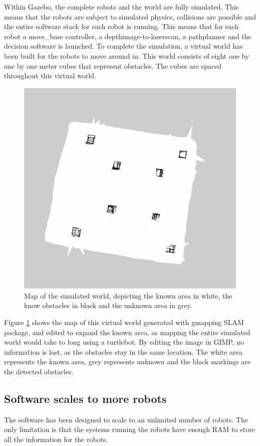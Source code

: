 \documentclass[10pt, journal]{IEEEtran}
\begin{document}
Within Gazebo, the complete robots and the world are fully simulated. This means that the robots are subject to simulated physics, collisions are possible and the entire software stack for each robot is running. This means that for each robot a move\_base controller, a depthimage-to-laserscan, a pathplanner and the decision software is launched. To complete the simulation, a virtual world has been built for the robots to move around in. This world consists of eight one by one by one meter cubes that represent obstacles. The cubes are spaced throughout this virtual world.
\begin{figure}[htp]
\centering
\includegraphics[width=\columnwidth]{gazebo_2}
\caption{Map of the simulated world, depicting the known area in white, the know obstacles in black and the unknown area in grey.}
\label{SimulatedWorldMap}
\end{figure}
Figure \ref{SimulatedWorldMap} shows the map of this virtual world generated with gmapping SLAM package\cite{SLAMGmapping}, and edited to expand the known area, as mapping the entire simulated world would take to long using a turtlebot. By editing the image in GIMP\cite{GIMP}, no information is lost, as the obstacles stay in the same location. The white area represents the known area, grey represents unknown and the black markings are the detected obstacles.
\subsection{Software scales to more robots}
The software has been designed to scale to an unlimited number of robots. The only limitation is that the systems running the robots have enough RAM to store all the information for the robots.
\end{document}

